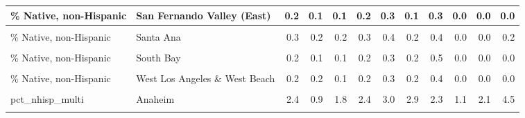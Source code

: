 \begin{table}[!h]
\begin{tabular}[t]{l|>{}l||r|r|r|r|r|r|r|r|r|r}
\hline
\% Native, non-Hispanic & San Fernando Valley (East) & 0.2 & 0.1 & 0.1 & 0.2 & 0.3 & 0.1 & 0.3 & 0.0 & 0.0 & 0.0\\
\hline
\cellcolor{gray!6}{\% Native, non-Hispanic} & \cellcolor{gray!6}{San Fernando Valley (West)} & \cellcolor{gray!6}{0.3} & \cellcolor{gray!6}{0.2} & \cellcolor{gray!6}{0.2} & \cellcolor{gray!6}{0.3} & \cellcolor{gray!6}{0.4} & \cellcolor{gray!6}{0.2} & \cellcolor{gray!6}{0.5} & \cellcolor{gray!6}{0.0} & \cellcolor{gray!6}{0.0} & \cellcolor{gray!6}{0.1}\\
\hline
\% Native, non-Hispanic & Santa Ana & 0.3 & 0.2 & 0.2 & 0.3 & 0.4 & 0.2 & 0.4 & 0.0 & 0.0 & 0.2\\
\hline
\cellcolor{gray!6}{\% Native, non-Hispanic} & \cellcolor{gray!6}{South \& South Central Los Angeles} & \cellcolor{gray!6}{0.2} & \cellcolor{gray!6}{0.2} & \cellcolor{gray!6}{0.1} & \cellcolor{gray!6}{0.2} & \cellcolor{gray!6}{0.3} & \cellcolor{gray!6}{0.1} & \cellcolor{gray!6}{0.4} & \cellcolor{gray!6}{0.0} & \cellcolor{gray!6}{0.0} & \cellcolor{gray!6}{0.0}\\
\hline
\% Native, non-Hispanic & South Bay & 0.2 & 0.1 & 0.1 & 0.2 & 0.3 & 0.2 & 0.5 & 0.0 & 0.0 & 0.0\\
\hline
\cellcolor{gray!6}{\% Native, non-Hispanic} & \cellcolor{gray!6}{South Orange Co} & \cellcolor{gray!6}{0.3} & \cellcolor{gray!6}{0.2} & \cellcolor{gray!6}{0.2} & \cellcolor{gray!6}{0.2} & \cellcolor{gray!6}{0.4} & \cellcolor{gray!6}{0.2} & \cellcolor{gray!6}{0.4} & \cellcolor{gray!6}{0.0} & \cellcolor{gray!6}{0.0} & \cellcolor{gray!6}{0.0}\\
\hline
\% Native, non-Hispanic & West Los Angeles \& West Beach & 0.2 & 0.2 & 0.1 & 0.2 & 0.3 & 0.2 & 0.4 & 0.0 & 0.0 & 0.0\\
\hline
\cellcolor{gray!6}{\% Native, non-Hispanic} & \cellcolor{gray!6}{Whittier \& North Orange Co} & \cellcolor{gray!6}{0.3} & \cellcolor{gray!6}{0.2} & \cellcolor{gray!6}{0.2} & \cellcolor{gray!6}{0.3} & \cellcolor{gray!6}{0.4} & \cellcolor{gray!6}{0.8} & \cellcolor{gray!6}{7.7} & \cellcolor{gray!6}{0.0} & \cellcolor{gray!6}{0.0} & \cellcolor{gray!6}{0.3}\\
\hline
pct\_nhisp\_multi & Anaheim & 2.4 & 0.9 & 1.8 & 2.4 & 3.0 & 2.9 & 2.3 & 1.1 & 2.1 & 4.5\\
\hline
\hline
\cellcolor{gray!6}{pct\_nhisp\_multi} & \cellcolor{gray!6}{Covina \& West Covina} & \cellcolor{gray!6}{2.0} & \cellcolor{gray!6}{0.8} & \cellcolor{gray!6}{1.4} & \cellcolor{gray!6}{2.0} & \cellcolor{gray!6}{2.6} & \cellcolor{gray!6}{2.0} & \cellcolor{gray!6}{2.1} & \cellcolor{gray!6}{0.4} & \cellcolor{gray!6}{1.5} & \cellcolor{gray!6}{2.9}\\

\end{tabular}
\end{table}
